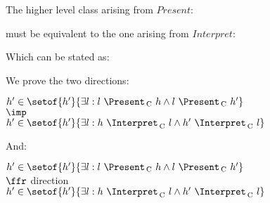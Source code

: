 The higher level class arising from $Present$:

must be equivalent to the one arising from $Interpret$:

Which can be stated as:


We prove the two directions:

$h' \in \setof{h'}{\exists l : l~\Present\C~h \land l~\Present\C~h'}$\\
$\imp$\\
$h' \in \setof{h'}{\exists l : h~\Interpret\C~l \land h'~\Interpret\C~l}$



And:

$h' \in \setof{h'}{\exists l : l~\Present\C~h \land l~\Present\C~h'}$\\
$\ffr$ direction\\
$h' \in \setof{h'}{\exists l : h~\Interpret\C~l \land h'~\Interpret\C~l}$


